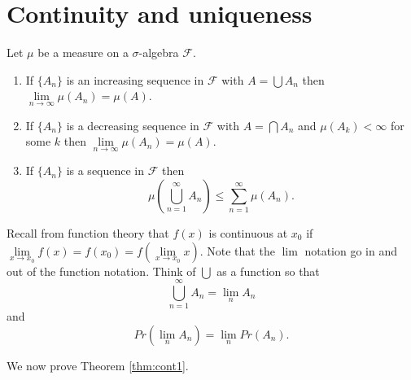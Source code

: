 \chapter{Continuity and uniqueness}

\begin{theorem}\label{thm:cont1}
Let $\mu$ be a measure on a $\sigma$-algebra $\mathcal F$.
\begin{enumerate}
\item If $\{A_n \}$ is an increasing sequence in $\mathcal F$ with $A=\bigcup A_n$ then $\lim\limits_{n\to\infty}\mu(A_n)=\mu(A)$.

\item If $\{A_n \}$ is a decreasing sequence in $\mathcal F$ with $A=\bigcap A_n$ and $\mu(A_k)<\infty$ for some $k$ then $\lim\limits_{n\to\infty}\mu(A_n)=\mu(A)$.

\item If $\{A_n \}$ is a sequence in $\mathcal F$ then 
\begin{equation*}
\mu\left(\bigcup_{n=1}^\infty A_n\right)\leq \sum_{n=1}^{\infty}\mu(A_n).
\end{equation*}
\end{enumerate}
\end{theorem}

\begin{notes}
Recall from function theory that $f(x)$ is continuous at $x_0$ if $\lim\limits_{x\to x_0}f(x)=f(x_0)=f(\lim\limits_{x\to x_0} x)$. Note that the $\lim$ notation go in and out of the function notation. Think of $\bigcup$ as a function so that 
\begin{equation*}
\bigcup_{n=1}^\infty A_n=\lim\limits_{n} A_n
\end{equation*}
and
\begin{equation*}
Pr(\lim\limits_{n}A_n)=\lim\limits_{n} Pr(A_n).
\end{equation*}
\end{notes}

We now prove Theorem \ref{thm:cont1}.

